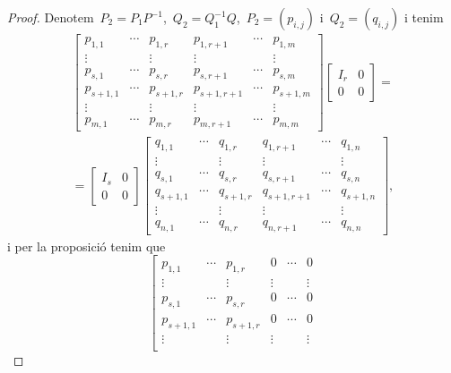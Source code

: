 \documentclass[../../Main.tex]{subfiles}
\begin{document}
\begin{theorem}
\begin{proof}
			Denotem~\(P_{2}=P_{1}P^{-1}\),~\(Q_{2}=Q_{1}^{-1}Q\),~\(P_{2}=(p_{i,j})\) i~\(Q_{2}=(q_{i,j})\) i tenim
			\begin{multline*}
			\left[\begin{array}{ccc|ccc}
			p_{1,1} & \cdots & p_{1,r} & p_{1,r+1} & \cdots & p_{1,m} \\
			\vdots & & \vdots & \vdots & & \vdots \\
			p_{s,1} & \cdots & p_{s,r} & p_{s,r+1} & \cdots & p_{s,m} \\\hline
			p_{s+1,1} & \cdots & p_{s+1,r} & p_{s+1,r+1} & \cdots & p_{s+1,m} \\
			\vdots & & \vdots & \vdots & & \vdots \\
			p_{m,1} & \cdots & p_{m,r} & p_{m,r+1} & \cdots & p_{m,m}
			\end{array}\right]
			\left[\begin{array}{c|c}
			I_{r} & 0\\\hline
			0 & 0
			\end{array}\right]=\\=
			\left[\begin{array}{c|c}
			I_{s} & 0\\\hline
			0 & 0
			\end{array}\right]
			\left[\begin{array}{ccc|ccc}
			q_{1,1} & \cdots & q_{1,r} & q_{1,r+1} & \cdots & q_{1,n} \\
			\vdots & & \vdots & \vdots & & \vdots \\
			q_{s,1} & \cdots & q_{s,r} & q_{s,r+1} & \cdots & q_{s,n} \\\hline
			q_{s+1,1} & \cdots & q_{s+1,r} & q_{s+1,r+1} & \cdots & q_{s+1,n} \\
			\vdots & & \vdots & \vdots & & \vdots \\
			q_{n,1} & \cdots & q_{n,r} & q_{n,r+1} & \cdots & q_{n,n}
			\end{array}\right],
			\end{multline*}
			i per la proposició  tenim que
			\[\left[\begin{array}{cccccc}
			p_{1,1} & \cdots & p_{1,r} & 0 & \cdots & 0 \\
			\vdots & & \vdots & \vdots & & \vdots \\
			p_{s,1} & \cdots & p_{s,r} & 0 & \cdots & 0 \\
			p_{s+1,1} & \cdots & p_{s+1,r} & 0 & \cdots & 0 \\
			\vdots & & \vdots & \vdots & & \vdots \\

\end{array}\]
\end{proof}
\end{theorem}
\end{document}
